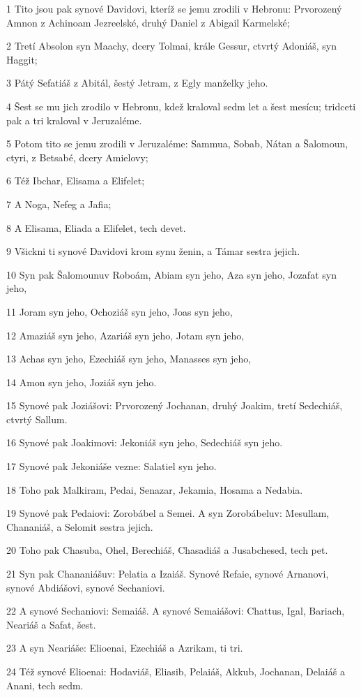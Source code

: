 \par 1 Tito jsou pak synové Davidovi, kteríž se jemu zrodili v Hebronu: Prvorozený Amnon z Achinoam Jezreelské, druhý Daniel z Abigail Karmelské;
\par 2 Tretí Absolon syn Maachy, dcery Tolmai, krále Gessur, ctvrtý Adoniáš, syn Haggit;
\par 3 Pátý Sefatiáš z Abitál, šestý Jetram, z Egly manželky jeho.
\par 4 Šest se mu jich zrodilo v Hebronu, kdež kraloval sedm let a šest mesícu; tridceti pak a tri kraloval v Jeruzaléme.
\par 5 Potom tito se jemu zrodili v Jeruzaléme: Sammua, Sobab, Nátan a Šalomoun, ctyri, z Betsabé, dcery Amielovy;
\par 6 Též Ibchar, Elisama a Elifelet;
\par 7 A Noga, Nefeg a Jafia;
\par 8 A Elisama, Eliada a Elifelet, tech devet.
\par 9 Všickni ti synové Davidovi krom synu ženin, a Támar sestra jejich.
\par 10 Syn pak Šalomounuv Roboám, Abiam syn jeho, Aza syn jeho, Jozafat syn jeho,
\par 11 Joram syn jeho, Ochoziáš syn jeho, Joas syn jeho,
\par 12 Amaziáš syn jeho, Azariáš syn jeho, Jotam syn jeho,
\par 13 Achas syn jeho, Ezechiáš syn jeho, Manasses syn jeho,
\par 14 Amon syn jeho, Joziáš syn jeho.
\par 15 Synové pak Joziášovi: Prvorozený Jochanan, druhý Joakim, tretí Sedechiáš, ctvrtý Sallum.
\par 16 Synové pak Joakimovi: Jekoniáš syn jeho, Sedechiáš syn jeho.
\par 17 Synové pak Jekoniáše vezne: Salatiel syn jeho.
\par 18 Toho pak Malkiram, Pedai, Senazar, Jekamia, Hosama a Nedabia.
\par 19 Synové pak Pedaiovi: Zorobábel a Semei. A syn Zorobábeluv: Mesullam, Chananiáš, a Selomit sestra jejich.
\par 20 Toho pak Chasuba, Ohel, Berechiáš, Chasadiáš a Jusabchesed, tech pet.
\par 21 Syn pak Chananiášuv: Pelatia a Izaiáš. Synové Refaie, synové Arnanovi, synové Abdiášovi, synové Sechaniovi.
\par 22 A synové Sechaniovi: Semaiáš. A synové Semaiášovi: Chattus, Igal, Bariach, Neariáš a Safat, šest.
\par 23 A syn Neariáše: Elioenai, Ezechiáš a Azrikam, ti tri.
\par 24 Též synové Elioenai: Hodaviáš, Eliasib, Pelaiáš, Akkub, Jochanan, Delaiáš a Anani, tech sedm.

